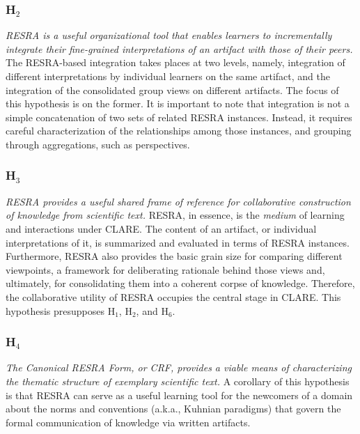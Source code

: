 \subsubsection{H\(_2\)}
\label{sec:RESRA2}

{\it RESRA is a useful organizational tool that enables learners to
incrementally integrate their fine-grained interpretations of an artifact
with those of their peers.} The RESRA-based integration takes places at two
levels, namely, integration of different interpretations by individual
learners on the same artifact, and the integration of the consolidated
group views on different artifacts. The focus of this hypothesis is on the
former. It is important to note that integration is not a simple
concatenation of two sets of related RESRA instances. Instead, it requires
careful characterization of the relationships among those instances, and
grouping through aggregations, such as perspectives.


\subsubsection{H\(_3\)}
\label{sec:RESRA3}

{\it RESRA provides a useful shared {\it frame of reference\/} for
collaborative construction of knowledge from scientific text.} RESRA, in
essence, is the {\it medium\/} of learning and interactions under
CLARE. The content of an artifact, or individual interpretations of it, is
summarized and evaluated in terms of RESRA instances. Furthermore, RESRA
also provides the basic grain size for comparing different viewpoints, a
framework for deliberating rationale behind those views and, ultimately,
for consolidating them into a coherent corpse of knowledge.  Therefore, the
collaborative utility of RESRA occupies the central stage in CLARE. This
hypothesis presupposes {\sf H\(_1\)}, {\sf H\(_2\)}, and {\sf H\(_6\)}.


\subsubsection{H\(_4\)}
\label{sec:RESRA4}

{\it The Canonical RESRA Form, or CRF, provides a viable means of
characterizing the thematic structure of exemplary scientific text.} A
corollary of this hypothesis is that RESRA can serve as a useful learning
tool for the newcomers of a domain about the norms and conventions (a.k.a.,
Kuhnian paradigms) that govern the formal communication of knowledge via
written artifacts.


